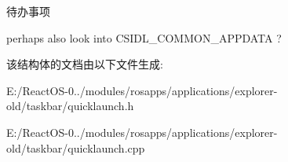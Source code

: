 \begin{DoxyRefDesc}{待办事项}
\item[\hyperlink{todo__todo000060}{待办事项}]perhaps also look into C\+S\+I\+D\+L\+\_\+\+C\+O\+M\+M\+O\+N\+\_\+\+A\+P\+P\+D\+A\+TA ? \end{DoxyRefDesc}


该结构体的文档由以下文件生成\+:\begin{DoxyCompactItemize}
\item 
E\+:/\+React\+O\+S-\/0../modules/rosapps/applications/explorer-\/old/taskbar/quicklaunch.\+h\item 
E\+:/\+React\+O\+S-\/0../modules/rosapps/applications/explorer-\/old/taskbar/quicklaunch.\+cpp\end{DoxyCompactItemize}

